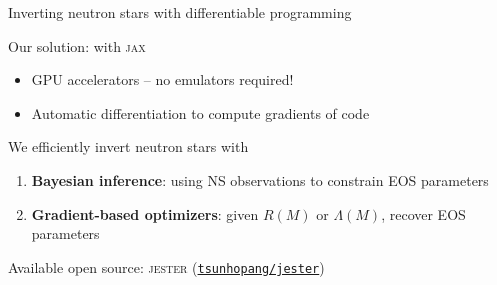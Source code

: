 \documentclass[usenames,dvipsnames,t]{beamer}
\begin{document}
\begin{frame}{Inverting neutron stars with differentiable programming}
  \def\x{3mm}
  \def\y{7mm}
  \def\z{10mm}

  Our solution:  with \textsc{jax}~\cite{frostig2018compiling}
  \begin{itemize}
    \vspace{\x}
    
    \item GPU accelerators -- no emulators required!
    
    \vspace{\x}
    \item Automatic differentiation to compute gradients of code
  \end{itemize}

  \vspace{\y}

  We efficiently invert neutron stars with
  \begin{enumerate}
    \vspace{\x}

    \item \textbf{Bayesian inference}: using NS observations to constrain EOS parameters

    \vspace{\x}

    \item \textbf{Gradient-based optimizers}: given $R(M)$ or $\Lambda(M)$, recover EOS parameters
  \end{enumerate}

  \vspace{\z}
  
  Available open source: \textsc{jester} (\href{https://github.com/tsunhopang/jester}{{\faGithub \texttt{tsunhopang/jester}}})
\end{frame}
\end{document}
